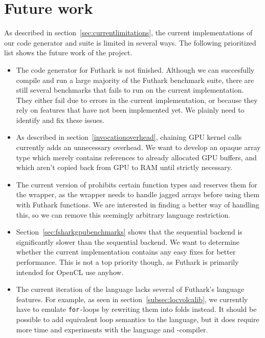 \section*{Future work}
As described in section~\ref{sec:currentlimitations}, the current
implementations of our code generator and \fshark{} suite is limited in several
ways. The following prioritized list shows the future work of the \fshark{}
project.
\begin{itemize}
\item The \csharp{} code generator for Futhark is not finished. Although we can
  succesfully compile and run a large majority of the Futhark benchmark suite,
  there are still several benchmarks that fails to run on the current implementation.
  They either fail due to errors in the current implementation, or because they rely on features that
  have not been implemented yet.
  We plainly need to identify and fix these issues.

\item As described in section~\ref{invocationoverhead}, chaining GPU kernel
  calls currently adds an unnecessary overhead. We want to develop an opaque
  array type which merely contains references to already allocated GPU buffers,
  and which aren't copied back from GPU to RAM until strictly necessary.

\item The current version of \fshark{} prohibits certain function types and
  reserves them for the \fshark{} wrapper, as the wrapper needs to handle jagged
  arrays before using them with \csharp{} Futhark functions.
  We are interested in finding a better way of handling this, so we can remove
  this seemingly arbitrary language restriction.
  
\item Section~\ref{sec:fsharkgpubenchmarks} shows that the sequential \csharp{}
  backend is significantly slower than the sequential \clang{} backend. We want to
  determine whether the current implementation contains any easy fixes for
  better performance. This is not a top priority though, as Futhark is primarily
  intended for OpenCL use anyhow.

\item The current iteration of the \fshark{} language lacks several of Futhark's
  language features.
  For example, as seen in section~\ref{subsec:locvolcalib}, we currently have to emulate \texttt{for-}loops by rewriting them into folds instead.
  It should be possible to add equivalent loop semantics to the \fshark{} language,
  but it does require more time and experiments with the \fsharp{} language and -compiler.


\end{itemize}
